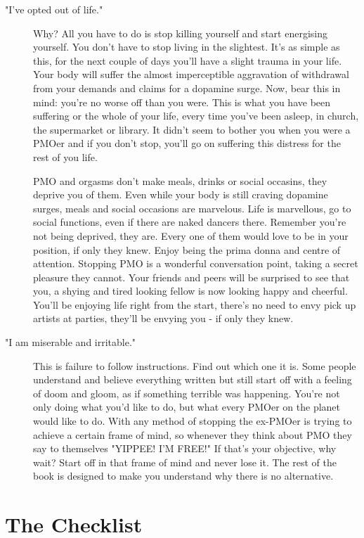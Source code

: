 \documentclass[easypeasy.tex]{subfiles}
\begin{document}
\begin{description}
\begin{description}
      \item ["I've opted out of life."] Why? All you have to do is stop killing yourself and start energising yourself. You don't have to stop living in the slightest. It's as simple as this, for the next couple of days you'll have a slight trauma in your life. Your body will suffer the almost imperceptible aggravation of withdrawal from your demands and claims for a dopamine surge. Now, bear this in mind: you're no worse off than you were. This is what you have been suffering or the whole of your life, every time you've been asleep, in church, the supermarket or library. It didn't seem to bother you when you were a PMOer and if you don't stop, you'll go on suffering this distress for the rest of you life.

      PMO and orgasms don't make meals, drinks or social occasins, they deprive you of them. Even while your body is still craving dopamine surges, meals and social occasions are marvelous. Life is marvellous, go to social functions, even if there are naked dancers there. Remember you're not being deprived, they are. Every one of them would love to be in your position, if only they knew. Enjoy being the prima donna and centre of attention. Stopping PMO is a wonderful conversation point, taking a secret pleasure they cannot. Your friends and peers will be surprised to see that you, a shying and tired looking fellow is now looking happy and cheerful. You'll be enjoying life right from the start, there's no need to envy pick up artists at parties, they'll be envying you - if only they knew.

     \item ["I am miserable and irritable."] This is failure to follow instructions. Find out which one it is. Some people understand and believe everything written but still start off with a feeling of doom and gloom, as if something terrible was happening. You're not only doing what you'd like to do, but what every PMOer on the planet would like to do. With any method of stopping the ex-PMOer is trying to achieve a certain frame of mind, so whenever they think about PMO they say to themselves "YIPPEE! I'M FREE!" If that's your objective, why wait? Start off in that frame of mind and never lose it. The rest of the book is designed to make you understand why there is no alternative.

\end{description}
\end{description}

\section{The Checklist}
\end{document}
